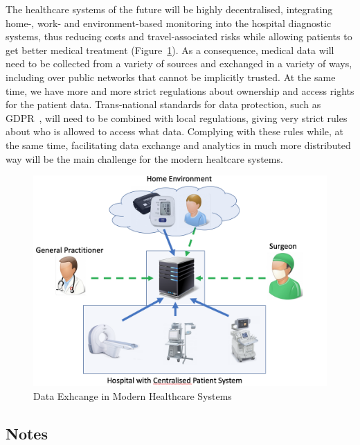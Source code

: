 \noindent
The healthcare systems of the future will be highly decentralised, integrating home-, work- and environment-based monitoring into the hospital diagnostic systems, thus reducing costs and travel-associated risks while allowing patients to get better medical treatment (Figure~\ref{fig:dataExch}). As a consequence, medical data will need to be collected from a variety of sources and exchanged in a variety of ways, including over public networks that cannot be implicitly trusted. At the same time, we have more and more strict regulations about ownership and access rights for the patient data. Trans-national standards for data protection, such as GDPR~\cite{gdpr}, will need to be combined with local regulations, giving very strict rules about who is allowed to access what data. Complying with these rules while, at the same time, facilitating data exchange and analytics in much more distributed way will be the main challenge for the modern healtcare systems.  

\begin{figure}[h!]
    \centering
    \includegraphics[scale=0.3]{images/DataExchange.png}
    \caption{Data Exhcange in Modern Healthcare Systems}
    \label{fig:dataExch}
\end{figure}



\subsection*{Notes}

